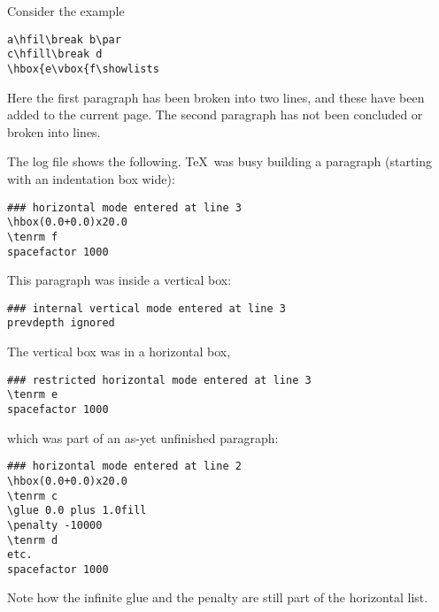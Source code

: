 \documentclass{book}
\begin{document}
Consider the example
\begin{verbatim}
a\hfil\break b\par 
c\hfill\break d
\hbox{e\vbox{f\showlists
\end{verbatim}
Here the first paragraph has been broken into two lines, and
these have been added to the current page. The second paragraph
has not been concluded or broken into lines.

The log file shows the following. \TeX\ was busy
building a paragraph (starting with an indentation box
\n{20pt} wide):\begin{verbatim}
### horizontal mode entered at line 3
\hbox(0.0+0.0)x20.0
\tenrm f
spacefactor 1000
\end{verbatim}
This paragraph was inside a vertical box:\begin{verbatim}
### internal vertical mode entered at line 3
prevdepth ignored
\end{verbatim}
The vertical box was in  a horizontal box, 
\begin{verbatim}
### restricted horizontal mode entered at line 3
\tenrm e
spacefactor 1000
\end{verbatim}
which was part of
an as-yet unfinished paragraph:\begin{verbatim}
### horizontal mode entered at line 2
\hbox(0.0+0.0)x20.0
\tenrm c
\glue 0.0 plus 1.0fill
\penalty -10000
\tenrm d
etc.
spacefactor 1000
\end{verbatim}
Note how the infinite glue and the  penalty
are still part of the horizontal list.
\end{document}
